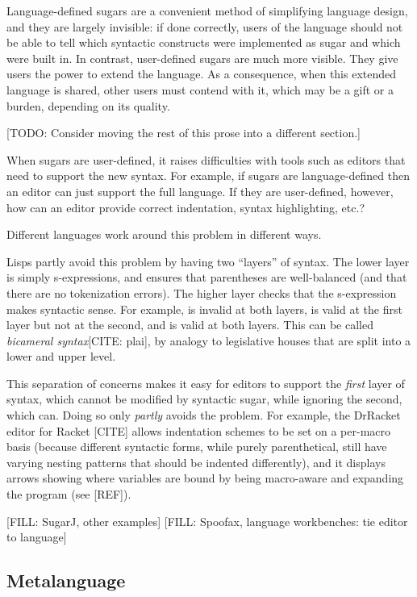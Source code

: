 Language-defined sugars are a convenient method of simplifying
language design, and they are largely invisible: if done correctly,
users of the language should not be able to tell which syntactic
constructs were implemented as sugar and which were built in.
In contrast, user-defined sugars are much more visible. They give
users the power to extend the language. As a consequence, when
this extended language is shared, other users must contend with it,
which may be a gift or a burden, depending on its quality.

[TODO: Consider moving the rest of this prose into a different section.]

When sugars are user-defined, it raises difficulties with tools such
as editors that need to support the new syntax. For example, if sugars
are language-defined then an editor can just support the full
language. If they are user-defined, however, how can an editor provide
correct indentation, syntax highlighting, etc.? %

Different languages work around this problem in different ways.

Lisps partly avoid this problem by having two ``layers'' of syntax.
The lower layer is simply s-expressions, and ensures that parentheses
are well-balanced (and that there are no tokenization errors).
The higher layer checks that the s-expression makes syntactic sense.
For example,  is invalid at both layers,
 is valid at the first layer but not at the
second, and  is valid at both layers.
This can be called \emph{bicameral syntax}[CITE: plai], by analogy to legislative
houses that are split into a lower and upper level.

This separation of concerns makes it easy for editors to support the
\emph{first} layer of syntax, which cannot be modified by syntactic
sugar, while ignoring the second, which can. Doing so only
\emph{partly} avoids the problem. For example, the DrRacket editor for
Racket [CITE] allows indentation schemes to be set on a per-macro
basis (because different syntactic forms, while purely parenthetical,
still have varying nesting patterns that should be indented
differently), and it displays arrows showing where variables are bound
by being macro-aware and expanding the program (see [REF]).

[FILL: SugarJ, other examples]
[FILL: Spoofax, language workbenches: tie editor to language]


\subsection{Metalanguage}

